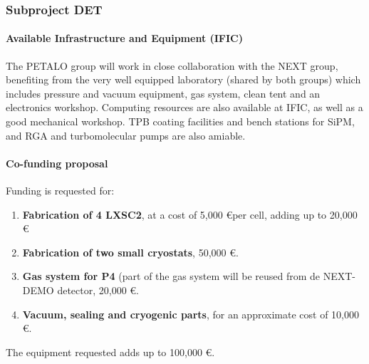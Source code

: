 \subsubsection*{Subproject DET}
\paragraph{Available Infrastructure and Equipment (IFIC)}

The PETALO group will work in close collaboration with the NEXT group, benefiting from the very well equipped laboratory (shared by both groups) which includes pressure and vacuum equipment, gas system, clean tent and an electronics workshop. Computing resources are also available at IFIC, as well as a good mechanical workshop. TPB coating facilities and bench stations for SiPM, and RGA and turbomolecular pumps are also amiable. 

\paragraph{Co-funding proposal}
Funding is requested for:

\begin{enumerate}
\item {\bf Fabrication of 4 LXSC2}, at a cost of 5,000 \euro per cell, adding up to 20,000 \euro
\item {\bf Fabrication of two small cryostats},  50,000 \euro.
\item {\bf Gas system for P4} (part of the gas system will be reused from de NEXT-DEMO detector,  20,000 \euro.
\item {\bf Vacuum, sealing and cryogenic parts}, for an approximate cost of 10,000 \euro.
\end{enumerate}

The equipment requested adds up to 100,000 \euro.  